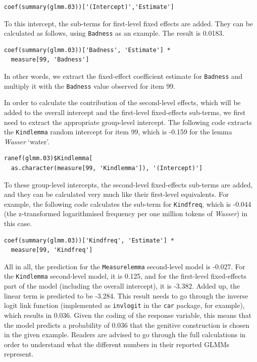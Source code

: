 \vspace{0.5\baselineskip}

\begin{lstlisting}
coef(summary(glmm.03))['(Intercept)','Estimate']
\end{lstlisting}

To this intercept, the sub-terms for first-level fixed effects are added.
They can be calculated as follows, using \texttt{Badness} as an example.
The result is 0.0183.

\vspace{0.5\baselineskip}

\begin{lstlisting}
coef(summary(glmm.03))['Badness', 'Estimate'] *
  measure[99, 'Badness']
\end{lstlisting}

In other words, we extract the fixed-effect coefficient estimate for \texttt{Badness} and multiply it with the \texttt{Badness} value observed for item 99.

In order to calculate the contribution of the second-level effects, which will be added to the overall intercept and the first-level fixed-effects sub-terms, we first need to extract the appropriate group-level intercept.
The following code extracts the \texttt{Kindlemma} random intercept for item 99, which is -0.159 for the lemma \textit{Wasser} `water'.

\vspace{0.5\baselineskip}

\begin{lstlisting}
ranef(glmm.03)$Kindlemma[
  as.character(measure[99, 'Kindlemma']), '(Intercept)']
\end{lstlisting}

To these group-level intercepts, the second-level fixed-effects sub-terms are added, and they can be calculated very much like their first-level equivalents.
For example, the following code calculates the sub-term for \texttt{Kindfreq}, which is -0.044 (the z-transformed logarithmised frequency per one million tokens of \textit{Wasser}) in this case.

\vspace{0.5\baselineskip}

\begin{lstlisting}
coef(summary(glmm.03))['Kindfreq', 'Estimate'] *
  measure[99, 'Kindfreq']
\end{lstlisting}

All in all, the prediction for the \texttt{Measurelemma} second-level model is -0.027.
For the \texttt{Kindlemma} second-level model, it is 0.125, and for the first-level fixed-effects part of the model (including the overall intercept), it is -3.382.
Added up, the linear term is predicted to be -3.284.
This result needs to go through the inverse logit link function (implemented as \texttt{invlogit} in the \texttt{car} package, for example), which results in 0.036.
Given the coding of the response variable, this means that the model predicts a probability of 0.036 that the genitive construction is chosen in the given example.
Readers are advised to go through the full calculations in order to understand what the different numbers in their reported GLMMs represent.
